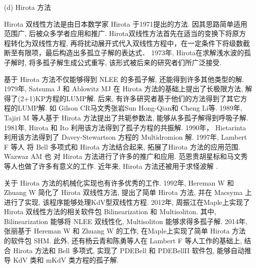(d) Hirota 方法

Hirota 双线性方法是由日本数学家 Hirota 于1971提出的方法\cite{hirota1971exact}. 因其思路简单\D 适用范围广, 后被众多学者应用和推广. Hirota双线性方法首先在适当的变换下将原方程转化为双线性方程, 再将扰动展开式代入双线性方程中，在一定条件下将级数截断至有限项，最后构造出多孤立子解的表达式． 1973年, Hirota\cite{hirota1973exact}在求解浅水波的孤子解时, 将多孤子解生成公式重写, 该形式被后来的研究者们所广泛接受. 

基于 Hirota 方法不仅能够得到 NLEE 的多孤子解, 还能得到许多其他类型的解. 1979年, Satsuma J 和 Ablowitz MJ 在 Hirota \cite{satsuma1979two}方法的基础上提出了长极限方法, 解得了(2+1)KP\cite{kadomtsev1970stability}方程的LUMP解. 后来, 有许多研究者基于他们的方法得到了其它方程的LUMP解. 如 Gilson CR\cite{gilson1990lump}\D 马文秀\cite{ma2015lump,zhang2017lump,chen2018lump}\D 张岩\cite{zhangYTSF,zhang2018m}\D Sun Hong-Qian\cite{sun2017lump}\D 和 Cheng Li\cite{cheng2017lump}等. 1989年, Tajiri M 等人\cite{tajiri1989breather}基于 Hirota 方法提出了共轭参数法, 能够从多孤子解得到呼吸子解. 1981年, Hirota 和 Ito \cite{hirota1983resonance}利用该方法得到了孤子方程的共振解. 1990年， Hietarinta \cite{hietarinta1990multidromion}利用该方法得到了 Davey-Stewartson 方程的 Multidromion 解. 1997年, Lambert F 等人\cite{gilson1996combinatorics,lambert1997construction,lambert2008soliton} 将 Bell 多项式和 Hirota 方法结合起来, 拓展了Hirota 方法的应用范围. Wazwaz AM 也\cite{wazwaz2008multiple,wazwaz2008integrable,wazwaz2009multiple,wazwaz20102,wazwaz2010multiple,wazwaz2012multiple} 对 Hirota 方法进行了许多的推广和应用. 范恩贵\cite{fan2011new}\D 胡星标\cite{hu1999soliton,hu2002application,hirota2003vector}和马文秀\cite{ma2011linear}等人也做了许多有意义的工作. 近年来, Hirota 方法还被用于求怪波解 \cite{guo2011rogue,sun2018general,zhaqilao2018symbolic}.

关于 Hirota 方法的机械化实现也有许多优秀的工作. 1992年, Hereman W 和 Zhuang W \cite{hereman1992symbolic,hereman1991macsyma} 简化了 Hirota 双线性方法, 提出了简单 Hirota 方法, 并在 Macsyma 上进行了实现, 该程序能够处理KdV型双线性方程. 2012年, 周振江\cite{zhou2012}在Maple上实现了 Hirota 双线性方法的相关软件包 Bilinearization 和 Multisoliton. 其中, Bilinearization 能够将 NLEE 双线性化, Multisoliton 能够求得多孤子解. 2014年, 张丽\cite{zhang2014}基于 Hereman W 和 Zhuang W 的工作, 在Maple上实现了简单 Hirota 方法的软件包 SHM. 此外, 还有杨云青和陈勇等人\cite{yang2011,miao2014pdebellii}在 Lambert F 等人工作的基础上, 结合 Hirota 方法和 Bell 多项式, 实现了 PDEBell 和 PDEBellII 软件包, 能够自动推导 KdV 类和 mKdV 类方程的孤子解. 

